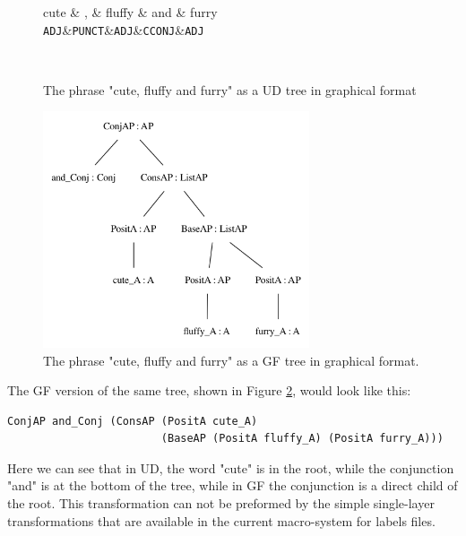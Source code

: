 \begin{figure}
    \centering
    \begin{dependency}
        \begin{deptext}[column sep=0.4cm]
              cute \& , \& fluffy \& and \& furry \\
            {\tt ADJ}\&{\tt PUNCT}\&{\tt ADJ}\&{\tt CCONJ}\&{\tt ADJ}\\
        \end{deptext}
    \end{dependency} \\
    \caption{The phrase "cute, fluffy and furry" as a UD tree in graphical format}
    \label{fig:ud_cute}
\end{figure}
% 

\begin{figure}
    \centering
    \includegraphics[width=0.7\textwidth]{figure/cute_gf.png}
    \caption{The phrase "cute, fluffy and furry" as a GF tree in graphical format. }
    \label{fig:gf_cute}
\end{figure}

The GF version of the same tree, shown in Figure \ref{fig:gf_cute}, would look like this:

\begin{verbatim}
ConjAP and_Conj (ConsAP (PositA cute_A)
                        (BaseAP (PositA fluffy_A) (PositA furry_A)))
\end{verbatim}
Here we can see that in UD, the word "cute" is in the root, while the conjunction "and" is at the bottom of the tree, while in GF the conjunction is a direct child of the root. This transformation can not be preformed by the simple single-layer transformations that are available in the current macro-system for labels files.



